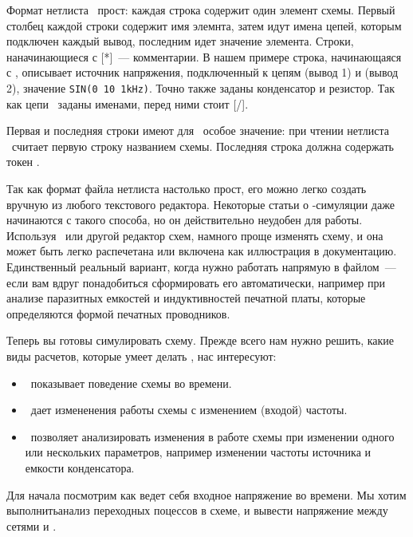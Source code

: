 
Формат нетлиста \spice\ прост: каждая строка содержит один элемент схемы.
Первый столбец каждой строки содержит имя элемнта, затем идут имена цепей,
которым подключен каждый вывод, последним идет значение элемента.
Строки, наначинающиеся с [*]\ --- комментарии.
В нашем примере строка, начинающаяся с , описывает источник напряжения,
подключенный к цепям  (вывод 1) и  (вывод 2), значение
\verb|SIN(0 10 1kHz)|. Точно также заданы конденсатор и резистор. Так как цепи
\ заданы именами, перед ними стоит [/].

Первая и последняя строки имеют для \ngs\ особое значение: при чтении нетлиста
\ngs\ считает первую строку названием схемы. Последняя строка должна содержать
токен .

Так как формат файла нетлиста настолько прост, его можно легко создать вручную
из любого текстового редактора. Некоторые статьи о \spice-симуляции даже
начинаются с такого способа, но он действительно неудобен для работы. Используя
\eeschema\ или другой редактор схем, намного проще изменять схему, и она может
быть легко распечетана или включена как иллюстрация в документацию. Единственный
реальный вариант, когда нужно работать напрямую в файлом\ --- если вам вдруг
понадобиться сформировать его автоматически, например при анализе паразитных
емкостей и индуктивностей печатной платы, которые определяются формой печатных
проводников.


Теперь вы готовы симулировать схему. Прежде всего нам нужно решить, какие виды
расчетов, которые умеет делать \spice, нас интересуют:

\begin{itemize}
  \item {}\ показывает поведение
  схемы во времени.
  \item {}\ дает измененения работы схемы с
  изменением (входой) частоты.
  \item {}\ позволяет анализировать изменения в
  работе схемы при изменении одного или нескольких параметров, например
  изменении частоты источника и емкости конденсатора.
\end{itemize}

Для начала посмотрим как ведет себя входное напряжение во времени. Мы хотим
выполнитьанализ переходных поцессов в схеме, и вывести напряжение между сетями
 и . 

